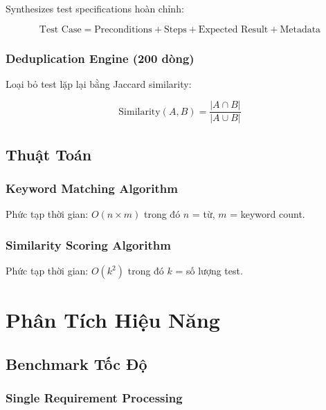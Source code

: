 \documentclass[12pt,oneside]{report}
\begin{document}
Synthesizes test specifications hoàn chỉnh:

\begin{equation}
\text{Test Case} = \text{Preconditions} + \text{Steps} + \text{Expected Result} + \text{Metadata}
\end{equation}

\subsection{Deduplication Engine (200 dòng)}

Loại bỏ test lặp lại bằng Jaccard similarity:

\begin{equation}
\text{Similarity}(A, B) = \frac{|A \cap B|}{|A \cup B|}
\end{equation}

\section{Thuật Toán}

\subsection{Keyword Matching Algorithm}

Phức tạp thời gian: $O(n \times m)$ trong đó $n$ = từ, $m$ = keyword count.

\subsection{Similarity Scoring Algorithm}

Phức tạp thời gian: $O(k^2)$ trong đó $k$ = số lượng test.


\chapter{Phân Tích Hiệu Năng}

\section{Benchmark Tốc Độ}

\subsection{Single Requirement Processing}
\end{document}
